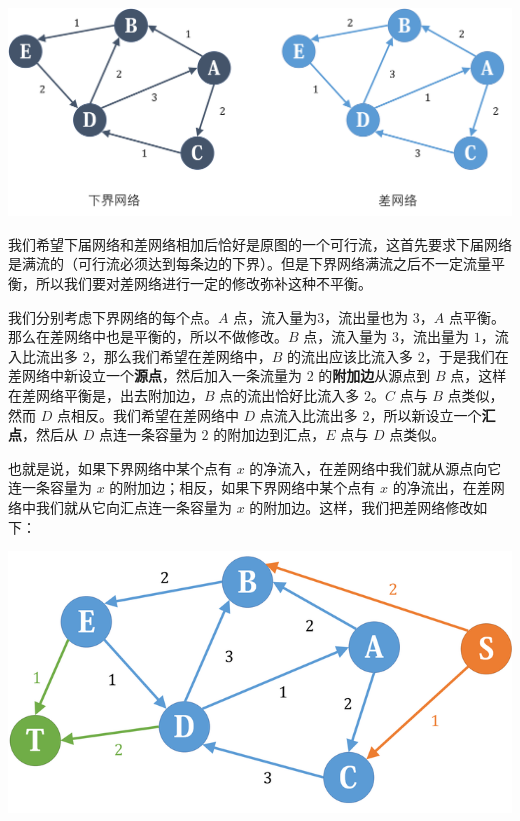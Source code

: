 \documentclass[12pt, a4paper, oneside]{ctexart}
\begin{document}
\centering %
\includegraphics[scale=0.18]{pic1.png}
\flushleft %

\qquad 我们希望下届网络和差网络相加后恰好是原图的一个可行流，这首先要求下届网络是满流的（可行流必须达到每条边的下界）。但是下界网络满流之后不一定流量平衡，所以我们要对差网络进行一定的修改弥补这种不平衡。\par
	
\qquad 我们分别考虑下界网络的每个点。$A$ 点，流入量为$3$，流出量也为 $3$，$A$ 点平衡。那么在差网络中也是平衡的，所以不做修改。$B$ 点，流入量为 $3$，流出量为 $1$，流入比流出多 $2$，那么我们希望在差网络中，$B$ 的流出应该比流入多 $2$，于是我们在差网络中新设立一个\textbf{源点}，然后加入一条流量为 $2$ 的\textbf{附加边}从源点到 $B$ 点，这样在差网络平衡是，出去附加边，$B$ 点的流出恰好比流入多 $2$。$C$ 点与 $B$ 点类似，然而 $D$ 点相反。我们希望在差网络中 $D$ 点流入比流出多 $2$，所以新设立一个\textbf{汇点}，然后从 $D$ 点连一条容量为 $2$ 的附加边到汇点，$E$ 点与 $D$ 点类似。\par

\qquad 也就是说，如果下界网络中某个点有 $x$ 的净流入，在差网络中我们就从源点向它连一条容量为 $x$ 的附加边；相反，如果下界网络中某个点有 $x$ 的净流出，在差网络中我们就从它向汇点连一条容量为 $x$ 的附加边。这样，我们把差网络修改如下：\par

\centering %
\includegraphics[scale=0.4]{pic2.png}
\flushleft %
\end{document}
